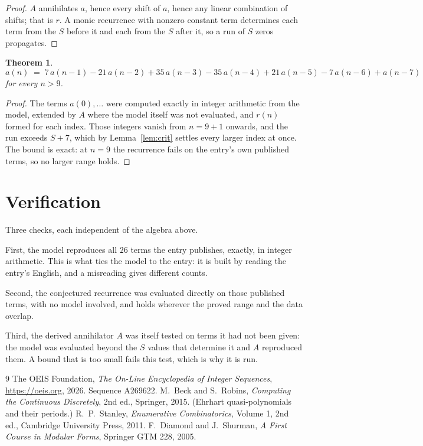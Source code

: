 \documentclass[11pt,a4paper]{article}
\theoremstyle{plain}
\newtheorem{theorem}{Theorem}
\theoremstyle{definition}
\begin{document}
\begin{proof}
$A$ annihilates $a$, hence every shift of $a$, hence any linear combination of shifts; that is
$r$. A monic recurrence with nonzero constant term determines each term from the $S$ before it
and each from the $S$ after it, so a run of $S$ zeros propagates.
\end{proof}

\begin{theorem}
\[
a(n)\;=\;7\,a(n-1) - 21\,a(n-2) + 35\,a(n-3) - 35\,a(n-4) + 21\,a(n-5) - 7\,a(n-6) + a(n-7)
\]
for every $n>9$.
\end{theorem}

\begin{proof}
The terms $a(0),\dots$ were computed exactly in integer arithmetic from the model, extended by
$A$ where the model itself was not evaluated, and $r(n)$ formed for each index. Those integers
vanish from $n=9+1$ onwards, and the run exceeds $S+7$, which by
Lemma~\ref{lem:crit} settles every larger index at once. The bound is exact: at $n=9$ the recurrence fails on the entry's own published terms, so no larger range holds.
\end{proof}

\section{Verification}

Three checks, each independent of the algebra above.

First, the model reproduces all $26$ terms the entry publishes, exactly, in integer
arithmetic. This is what ties the model to the entry: it is built by reading the entry's
English, and a misreading gives different counts.

Second, the conjectured recurrence was evaluated directly on those published terms, with no
model involved, and holds wherever the proved range and the data overlap.

Third, the derived annihilator $A$ was itself tested on terms it had not been given: the model
was evaluated beyond the $S$ values that determine it and $A$ reproduced them. A bound that is
too small fails this test, which is why it is run.

\begin{thebibliography}{9}
 The OEIS Foundation, \emph{The On-Line Encyclopedia of Integer
Sequences}, \url{https://oeis.org}, 2026. Sequence A269622.
 M.~Beck and S.~Robins, \emph{Computing the Continuous Discretely},
2nd ed., Springer, 2015. (Ehrhart quasi-polynomials and their periods.)
 R.~P.~Stanley, \emph{Enumerative Combinatorics}, Volume 1, 2nd ed.,
Cambridge University Press, 2011.
 F.~Diamond and J.~Shurman, \emph{A First Course in Modular Forms},
Springer GTM 228, 2005.
\end{thebibliography}
\end{document}
